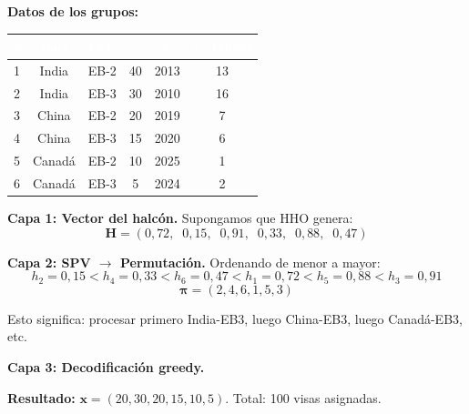 \documentclass[12pt,letterpaper]{article}
\begin{document}
\begin{examplebox}
\textbf{Datos de los grupos:}

\vspace{0.3em}
\begin{tabular}{cccccc}
\toprule
\rowcolor{tablehead}
\textcolor{white}{$g$} & \textcolor{white}{País} & \textcolor{white}{Cat.} & \textcolor{white}{$n_g$} & \textcolor{white}{$d_g$} & \textcolor{white}{$w_g$ (años)} \\
\midrule
1 & India & EB-2 & 40 & 2013 & 13 \\
\rowcolor{gray!8}
2 & India & EB-3 & 30 & 2010 & 16 \\
3 & China & EB-2 & 20 & 2019 & 7 \\
\rowcolor{gray!8}
4 & China & EB-3 & 15 & 2020 & 6 \\
5 & Canadá & EB-2 & 10 & 2025 & 1 \\
\rowcolor{gray!8}
6 & Canadá & EB-3 & 5 & 2024 & 2 \\
\bottomrule
\end{tabular}
\end{examplebox}

\textbf{Capa 1: Vector del halcón.} Supongamos que HHO genera:
$$\mathbf{H} = (0{,}72,\;\; 0{,}15,\;\; 0{,}91,\;\; 0{,}33,\;\; 0{,}88,\;\; 0{,}47)$$

\textbf{Capa 2: SPV $\rightarrow$ Permutación.} Ordenando de menor a mayor:
$$h_2 = 0{,}15 < h_4 = 0{,}33 < h_6 = 0{,}47 < h_1 = 0{,}72 < h_5 = 0{,}88 < h_3 = 0{,}91$$
$$\boldsymbol{\pi} = (2, 4, 6, 1, 5, 3)$$

Esto significa: procesar primero India-EB3, luego China-EB3, luego Canadá-EB3, etc.

\textbf{Capa 3: Decodificación greedy.}

\begin{examplebox}

\vspace{0.5em}
\textbf{Resultado:} $\mathbf{x} = (20, 30, 20, 15, 10, 5)$. Total: 100 visas asignadas.
\end{examplebox}
\end{document}
